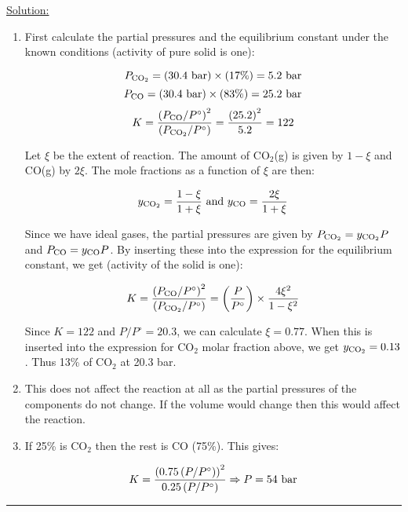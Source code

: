\noindent
\underline{Solution:}

\begin{enumerate}

\item First calculate the partial pressures and the equilibrium constant under the known conditions (activity of pure solid is one): 

$$P_{\textnormal{CO}_2} = \left(30.4\textnormal{ bar}\right)\times\left(17\%\right) = 5.2\textnormal{ bar}$$
$$P_{\textnormal{CO}} = \left(30.4\textnormal{ bar}\right)\times\left(83\%\right) = 25.2\textnormal{ bar}$$
$$K = \frac{\left(P_{\textnormal{CO}}/P^\circ\right)^2}{\left(P_{\textnormal{CO}_2} / P^\circ\right)} = \frac{\left(25.2\right)^2}{5.2} = 122$$

Let $\xi$ be the extent of reaction. The amount of CO$_2$(g) is given by $1-\xi$ and CO(g) by $2\xi$. The mole fractions as a function of $\xi$ are then:

$$y_{\textnormal{CO}_2} = \frac{1-\xi}{1+\xi}\textnormal{ and }y_{\textnormal{CO}} = \frac{2\xi}{1+\xi}$$

Since we have ideal gases, the partial pressures are given by $P_{\textnormal{CO}_2} = y_{\textnormal{CO}_2}P$ and $P_{\textnormal{CO}} = y_{\textnormal{CO}}P$. By inserting these into the expression for the equilibrium constant, we get (activity of the solid is one):

$$K = \frac{\left(P_{\textnormal{CO}} / P^\circ\right)^2}{\left(P_{\textnormal{CO}_2}/P^\circ\right)} = \left(\frac{P}{P^\circ}\right)\times\frac{4\xi^2}{1-\xi^2}$$

Since $K = 122$ and $P/P^\circ = 20.3$, we can calculate $\xi = 0.77$. When this is inserted into the expression for CO$_2$ molar fraction above, we get $y_{\textnormal{CO}_2} = 0.13$. Thus 13\% of CO$_2$ at 20.3 bar.

\item This does not affect the reaction at all as the partial pressures of the components do not change. If the volume would change then this would affect the reaction.

\item If 25\% is CO$_2$ then the rest is CO (75\%). This gives:

$$K = \frac{\left(0.75\left(P/P^\circ\right)\right)^2}{0.25\left(P/P^\circ\right)} \Rightarrow P = 54\textnormal{ bar}$$

\end{enumerate}

\hrule\vspace{0.5cm}

